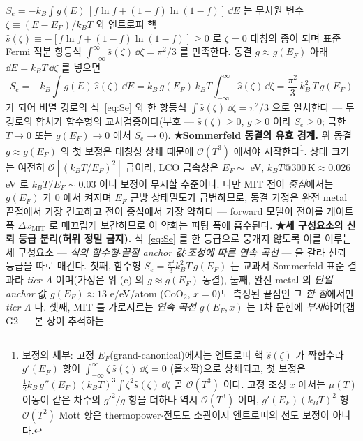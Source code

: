 $S_e=-k_B\int g(E)\,[f\ln f+(1-f)\ln(1-f)]\,\dd E$ 는 무차원 변수 $\zeta\equiv(E-E_F)/k_BT$ 와 엔트로피 핵
$\hat s(\zeta)\equiv-[f\ln f+(1-f)\ln(1-f)]\ge0$ 로 $\zeta=0$ 대칭의 종이 되며 표준 Fermi 적분 항등식
$\int_{-\infty}^{\infty}\hat s(\zeta)\,\dd\zeta=\pi^2/3$ 를 만족한다. 동결 $g\approx g(E_F)$ 아래 $\dd E=k_BT\,\dd\zeta$
를 넣으면
\begin{equation}
S_e=+k_B\int g(E)\,\hat s(\zeta)\,\dd E
=k_B\,g(E_F)\,k_BT\!\int_{-\infty}^{\infty}\!\hat s(\zeta)\,\dd\zeta
=\frac{\pi^2}{3}\,k_B^2\,T\,g(E_F)
\label{eq:Sedirect}
\end{equation}
가 되어 비열 경로의 식~\eqref{eq:Se} 와 한 항등식 $\int \hat s(\zeta)\,\dd\zeta=\pi^2/3$ 으로 일치한다 --- 두 경로의
합치가 함수형의 교차검증이다(부호 --- $\hat s(\zeta)\ge0$, $g\ge0$ 이라 $S_e\ge0$; 극한 $T\to0$ 또는 $g(E_F)\to0$ 에서
$S_e\to0$).
\textbf{★Sommerfeld 동결의 유효 경계.} 위 동결 $g\approx g(E_F)$ 의 첫 보정은 대칭성 상쇄 때문에
$\mathcal O(T^3)$ 에서야 시작한다\footnote{보정의 세부: 고정 $E_F$(grand-canonical)에서는 엔트로피 핵
$\hat s(\zeta)$ 가 짝함수라 $g'(E_F)$ 항이 $\int_{-\infty}^{\infty}\!\zeta\,\hat s(\zeta)\,\dd\zeta=0$
(홀$\times$짝)으로 상쇄되고, 첫 보정은 $\tfrac12 k_B\,g''(E_F)(k_BT)^3\!\int\zeta^2 \hat s(\zeta)\,\dd\zeta$
곧 $\mathcal O(T^3)$ 이다. 고정 조성 $x$ 에서는 $\mu(T)$ 이동이 같은 차수의 $g'^2/g$ 항을 더하나 역시
$\mathcal O(T^3)$ 이며, $g'(E_F)(k_BT)^2$ 형 $\mathcal O(T^2)$ Mott 항은 thermopower$\cdot$전도도
소관이지 엔트로피의 선도 보정이 아니다.}. 상대 크기는 여전히 $\mathcal O[(k_BT/E_F)^2]$ 급이라,
LCO 금속상은 $E_F\sim$ eV, $k_BT@300\,\mathrm K\approx0.026$ eV 로 $k_BT/E_F\sim0.03$ 이니 보정이 무시할 수준이다. 다만 MIT 전이 \emph{중심}에서는 $g(E_F)$
가 0 에서 켜지며 $E_F$ 근방 상태밀도가 급변하므로, 동결 가정은 완전 metal 끝점에서 가장 견고하고 전이 중심에서
가장 약하다 --- forward 모델이 전이를 게이트 폭 $\Delta x_\mathrm{MIT}$ 로 매끄럽게 보간하므로 이 약화는 피팅 폭에
흡수된다. \textbf{★세 구성요소의 신뢰 등급 분리(허위 정밀 금지).}
식~\eqref{eq:Se} 를 한 등급으로 뭉개지 않도록 이를 이루는 세 구성요소 --- \emph{식의 함수형}$\cdot$\emph{끝점
anchor 값}$\cdot$\emph{조성에 따른 연속 곡선} --- 을 갈라 신뢰 등급을 따로 매긴다. 첫째, 함수형
$S_e=\tfrac{\pi^2}{3}k_B^2T\,g(E_F)$ 는 교과서 Sommerfeld 표준 결과라 \emph{tier A} 이며(가정은 위 (c) 의
$g\!\approx\!g(E_F)$ 동결), 둘째, 완전 metal 의 \emph{단일 anchor} 값 $g(E_F)\!\approx\!13$ e/eV/atom
($\mathrm{CoO_2}$, $x{=}0$)도 측정된 끝점인 그 \emph{한 점}에서만 \emph{tier A} 다\cite{motohashi2009}. 셋째,
MIT 를 가로지르는 \emph{연속 곡선} $g(E_F,x)$ 는 1차 문헌에 \emph{부재}하여(갭 G2 --- 본 장이 추적하는
